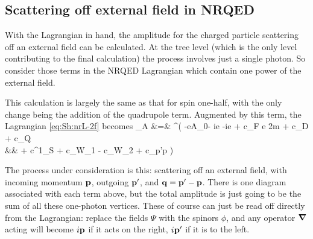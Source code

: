 \subsection{Scattering off external field in NRQED}
With the Lagrangian in hand, the amplitude for the charged particle scattering off an external field can be calculated.  At the tree level (which is the only level contributing to the final calculation) the process involves just a single photon.  So consider those terms in the NRQED Lagrangian which contain one power of the external field.  


This calculation is largely the same as that for spin one-half, with the only change being the addition of the quadrupole term.  Augmented by this term, the Lagrangian \eqref{eq:Sh:nrL-2f} becomes 
\small
\beqa
{}_A &=& \Psi^\dagger (  -eA_0- ie   -ie  
		+ c_F e  {2m}   	
		+ c_D 	
		+ c_Q 	
	\\&&	+ c^{1}_S 
		+ c_{W_1} 	
		- c_{W_2} 
		+ c_{p'p} \frac{ e [ (\v{S} \smalldot \v{\grad}) (\v{B} \smalldot \v{\grad}) + (\v{B} \smalldot \v{\grad})(\v{S} \smalldot \v{\grad}) }{8m^3} \big )\Psi
\eeqa
\normalsize


The process under consideration is this: scattering off an external field, with incoming momentum $\mathbf{p}$, outgoing $\mathbf{p'}$, and $\mathbf{q} = \mathbf{p'} - \mathbf{p}$.  There is one diagram associated with each term above, but the total amplitude is just going to be the sum of all these one-photon vertices.  These of course can just be read off directly from the Lagrangian: replace the fields $\Psi$ with the spinors $\phi$, and any operator $\grad$ acting will become $i\mathbf{p}$ if it acts on the right, $i\mathbf{p'}$ if it is to the left.

